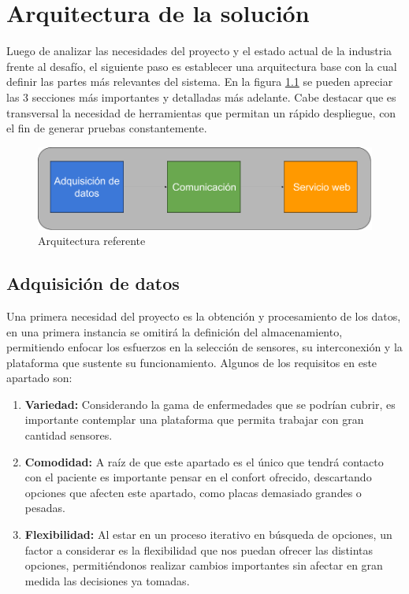 \chapter{Arquitectura de la solución}\label{arquitectura}

Luego de analizar las necesidades del proyecto y el estado actual de la industria frente al desafío, el siguiente paso es establecer una arquitectura base con la cual definir las partes más relevantes del sistema. En la figura \ref{arqui} se pueden apreciar las 3 secciones más importantes y detalladas más adelante. Cabe destacar que es transversal la necesidad de herramientas que permitan un rápido despliegue, con el fin de generar pruebas constantemente.

\begin{figure}[H]
	\centering
	\includegraphics[scale=0.43]{figuras/arquitectura/arqui.png}
	\caption{Arquitectura referente}
	\label{arqui}
\end{figure}

\newpage
\section{Adquisición de datos}
Una primera necesidad del proyecto es la obtención y procesamiento de los datos, en una primera instancia se omitirá la definición del almacenamiento, permitiendo enfocar los esfuerzos en la selección de sensores, su interconexión y la plataforma que sustente su funcionamiento. Algunos de los requisitos en este apartado son:

\begin{enumerate}
	\item \textbf{Variedad:}
	Considerando la gama de enfermedades que se podrían cubrir, es importante contemplar una plataforma que permita trabajar con gran cantidad sensores.
	\item \textbf{Comodidad:}
	A raíz de que este apartado es el único que tendrá contacto con el paciente es importante pensar en el confort ofrecido, descartando opciones que afecten este apartado, como placas demasiado grandes o pesadas.
	\item \textbf{Flexibilidad:}
	Al estar en un proceso iterativo en búsqueda de opciones, un factor a considerar es la flexibilidad que nos puedan ofrecer las distintas opciones, permitiéndonos realizar cambios importantes sin afectar en gran medida las decisiones ya tomadas.
\end{enumerate}

